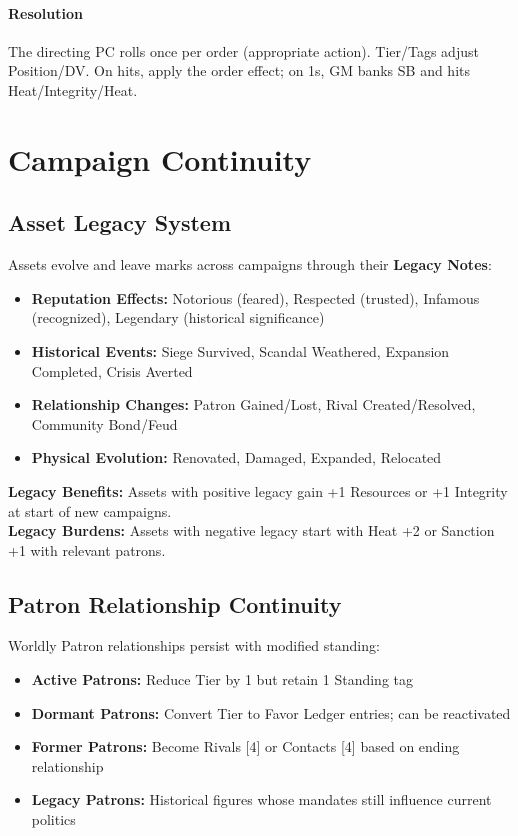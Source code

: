 \documentclass[10pt]{article}
\begin{document}
    \paragraph{Resolution} The directing PC rolls once per order (appropriate action). Tier/Tags adjust Position/DV. On hits, apply the order effect; on 1s, GM banks SB and hits Heat/Integrity/Heat.
    
    \section{Campaign Continuity}
    \subsection{Asset Legacy System}
    Assets evolve and leave marks across campaigns through their \textbf{Legacy Notes}:
    \begin{itemize}
      \item \textbf{Reputation Effects:} Notorious (feared), Respected (trusted), Infamous (recognized), Legendary (historical significance)
      \item \textbf{Historical Events:} Siege Survived, Scandal Weathered, Expansion Completed, Crisis Averted
      \item \textbf{Relationship Changes:} Patron Gained/Lost, Rival Created/Resolved, Community Bond/Feud
      \item \textbf{Physical Evolution:} Renovated, Damaged, Expanded, Relocated
    \end{itemize}
    
    \textbf{Legacy Benefits:} Assets with positive legacy gain +1 Resources or +1 Integrity at start of new campaigns.\\
    \textbf{Legacy Burdens:} Assets with negative legacy start with Heat +2 or Sanction +1 with relevant patrons.
    
    \subsection{Patron Relationship Continuity}
    Worldly Patron relationships persist with modified standing:
    \begin{itemize}
      \item \textbf{Active Patrons:} Reduce Tier by 1 but retain 1 Standing tag
      \item \textbf{Dormant Patrons:} Convert Tier to Favor Ledger entries; can be reactivated
      \item \textbf{Former Patrons:} Become Rivals [4] or Contacts [4] based on ending relationship
      \item \textbf{Legacy Patrons:} Historical figures whose mandates still influence current politics
    \end{itemize}
    
\end{document}
